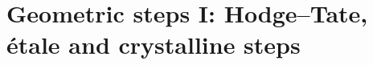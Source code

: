 \section{Geometric steps I: Hodge--Tate, \'etale and crystalline steps}\label{sec:pf:steps1}

\providecommand{\stepsIBcris}{B_{\mathrm{cris}}}
\providecommand{\stepsIBdR}{B_{\mathrm{dR}}}
\providecommand{\stepsIBst}{B_{\mathrm{st}}}
\providecommand{\stepsIAcris}{A_{\mathrm{cris}}}
\providecommand{\stepsIDcris}{D_{\mathrm{cris}}}
\providecommand{\stepsIDst}{D_{\mathrm{st}}}
\providecommand{\stepsIDdR}{D_{\mathrm{dR}}}
\providecommand{\stepsIH}{\mathrm{H}}
\providecommand{\stepsIHQ}{\mathrm{H}_{\mathbb{Q}}}
\providecommand{\stepsIHl}{\mathrm{H}_{\ell}}
\providecommand{\stepsIHtot}{\mathrm{H}_{\mathrm{tot}}}
\providecommand{\stepsIHdg}{\mathrm{Hdg}}
\providecommand{\stepsIPiece}{\mathrm{Piece}}
\providecommand{\stepsIhop}{\mathrm{hop}}
\providecommand{\stepsICl}{\mathbb{C}_\ell}
\providecommand{\stepsIHk}{P^{\mathrm{Hk}}}
\providecommand{\stepsIrt}{P^{\mathrm{rt}}}
\providecommand{\stepsINw}{\mathrm{N}w}
\providecommand{\stepsIOw}{\mathcal{O}_{(w)}}
\providecommand{\stepsISpc}{\mathsf{Spc}}
\providecommand{\stepsISch}{\mathsf{Sch}}
\providecommand{\stepsISh}{\mathsf{Sh}}
\providecommand{\stepsIBGL}{\mathrm{BGL}}
\providecommand{\stepsIPGL}{\mathrm{P}}
\providecommand{\stepsItw}{\mathbb{Z}/q(i)}
\providecommand{\stepsIsch}{\mathrm{sch}}
\providecommand{\stepsIsp}{\mathrm{sp}}
\providecommand{\stepsIchar}{\chi_{\mathrm{cyc}}}

